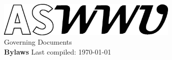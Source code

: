 \documentclass[10pt, letterpaper]{book}
\begin{document}
\nolinenumbers
\begin{titlepage}
    \begin{center}
        \vspace*{5cm}
  		\includegraphics[width=0.65\textwidth]{Formatting/Logo_ASWWU-Black}\\
        \LARGE Governing Documents\\ \Huge \textbf{Bylaws}
        \vfill
        \normalsize Last compiled: \today\ \currenttime
             
    \end{center}
 \end{titlepage}
\setcounter{tocdepth}{1}
\tableofcontents
\linenumbers
\newpage
\end{document}
